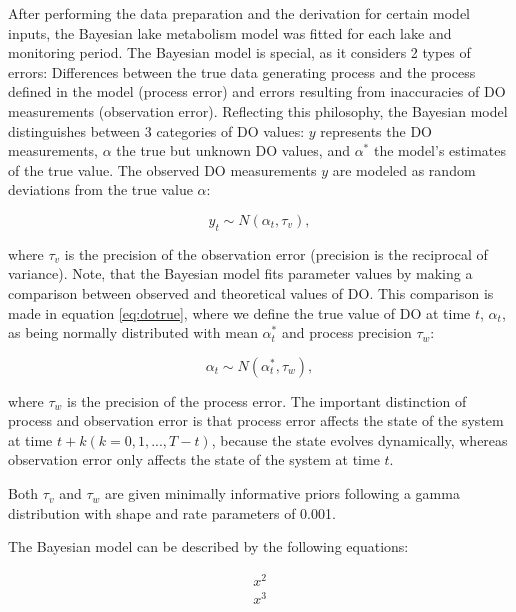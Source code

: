 \documentclass[11pt,lineno]{manuscript}\usepackage[]{graphicx}\usepackage[]{xcolor}
\begin{document}
After performing the data preparation and the derivation for certain model
inputs, the Bayesian lake metabolism model was fitted for each lake and
monitoring period. The Bayesian model is special, as it considers 2 types
of errors: Differences between the true data generating process and the process
defined in the model (process error) and errors resulting from inaccuracies
of DO measurements (observation error). Reflecting this philosophy, the
Bayesian model distinguishes between 3 categories of DO values: $y$ represents
the DO measurements, $\alpha$ the true but unknown DO values, and
$\alpha^{\ast}$ the model's estimates of the true value.
The observed DO measurements $y$ are modeled as random deviations from the true
value $\alpha$:

\begin{equation}
y_{t} \sim N(\alpha_{t}, \tau_{v}),
\label{eq:doobs}
\end{equation}

where $\tau_{v}$ is the precision of the observation error (precision is
the reciprocal of variance).
Note, that the Bayesian model fits parameter values by making a comparison
between observed and theoretical values of DO.
This comparison is made in equation \ref{eq:dotrue}, where we define the true value of 
DO at time $t$, $\alpha_{t}$, as being normally distributed with mean 
$\alpha^{\ast}_{t}$ and process precision $\tau_{w}$:

\begin{equation}
\alpha_{t} \sim N(\alpha^{\ast}_{t}, \tau_{w}),
\label{eq:dotrue}
\end{equation}

where $\tau_{w}$ is the precision of the process error.
The important distinction of process and observation error is that
process error affects the state of the system at time
$t + k(k=0, 1, ..., T-t)$, because the state evolves dynamically, whereas
observation error only affects the state of the system at time $t$.

Both $\tau_{v}$ and $\tau_{w}$ are given minimally informative priors
following a gamma distribution with shape and rate parameters of 0.001.

The Bayesian model can be described by the following equations:

\begin{gather}
x^{2} \label{eq:sys1}\\
x^{3} \label{eq:sys2}
\end{gather}
\end{document}
